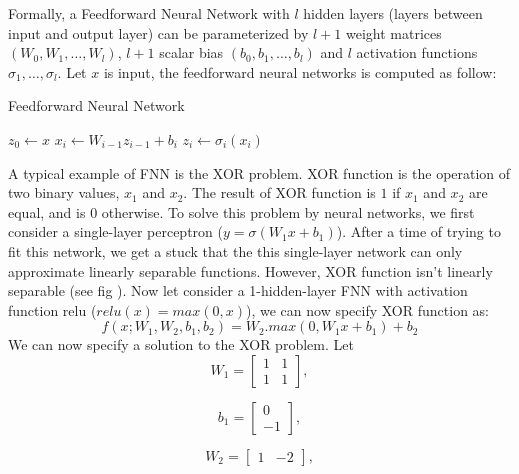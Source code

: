 Formally, a Feedforward Neural Network with $\displaystyle l$ hidden layers (layers between input and output layer) can be parameterized by $\displaystyle l + 1$ weight matrices $\displaystyle (W_0, W_1, \dots, W_l)$, $\displaystyle l + 1$ scalar bias $\displaystyle (b_0, b_1, \dots, b_l)$ and $\displaystyle l$ activation functions $\displaystyle \sigma_1, \dots, \sigma_l$. Let $\displaystyle x$ is input, the feedforward neural networks is computed as follow:
\begin{algorithm}
    \caption{Feedforward Neural Network}
    \begin{algorithmic}[1]
        \State $z_0 \gets x$
            \State $x_i \gets W_{i - 1}z_{i - 1} + b_i$
            \State $z_i \gets \sigma_i(x_i)$
        \EndFor
    \end{algorithmic}
\end{algorithm}

A typical example of FNN is the XOR problem. XOR function is the operation of two binary values, $\displaystyle x_1$ and $\displaystyle x_2$. The result of XOR function is $\displaystyle 1$ if $\displaystyle x_1$ and $\displaystyle x_2$ are equal, and is $\displaystyle 0$ otherwise. To solve this problem by neural networks, we first consider a single-layer perceptron ($\displaystyle y = \sigma(W_1x + b_1)$). After a time of trying to fit this network, we get a stuck that the this single-layer network can only approximate linearly separable functions. However, XOR function isn't linearly separable (see fig %
). Now let consider a 1-hidden-layer FNN with activation function relu ($\displaystyle relu(x) = max(0, x)$), we can now specify XOR function as:
\[ f(x; W_1, W_2, b_1, b_2) = W_2.max(0, W_1x + b_1) + b_2 \label{equation_xor} \]
We can now specify a solution to the XOR problem. Let
\[ W_1 = 
\begin{bmatrix}
    1 & 1 \\
    1 & 1
\end{bmatrix}, \]

\[ b_1 =
\begin{bmatrix}
    0 \\
    -1
\end{bmatrix}, \]

\[ W_2 =
\begin{bmatrix}
    1 & -2
\end{bmatrix}, \]

